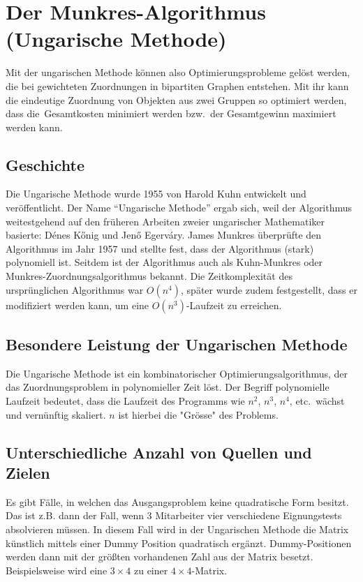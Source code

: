 %
%
%
\section{Der Munkres-Algorithmus (Ungarische Methode)
\label{munkres:section:teil3}}

Mit der ungarischen Methode können also Optimierungsprobleme gelöst
werden, die bei gewichteten Zuordnungen in bipartiten Graphen entstehen.
Mit ihr kann die eindeutige Zuordnung von Objekten aus zwei Gruppen so
optimiert werden, dass die Gesamtkosten minimiert werden bzw.~der
Gesamtgewinn maximiert werden kann. 

\subsection{Geschichte
\label{munkres:subsection:malorum}}
Die Ungarische Methode wurde 1955 von Harold Kuhn entwickelt und veröffentlicht.
Der Name ``Ungarische Methode'' ergab sich, weil der Algorithmus
weitestgehend auf den früheren Arbeiten zweier ungarischer Mathematiker
basierte: Dénes Kőnig und Jenő Egerváry.
James Munkres überprüfte den Algorithmus im Jahr 1957 und stellte fest,
dass der Algorithmus (stark) polynomiell ist.
Seitdem ist der Algorithmus auch als Kuhn-Munkres oder
Munkres-Zuordnungsalgorithmus bekannt.
Die Zeitkomplexität des ursprünglichen Algorithmus war $O(n^4)$,
später wurde zudem festgestellt, dass er modifiziert werden kann,
um eine  $O(n^3)$-Laufzeit zu erreichen.

\subsection{Besondere Leistung der Ungarischen Methode
\label{munkres:subsection:malorum}}
Die Ungarische Methode ist ein kombinatorischer Optimierungsalgorithmus, der das Zuordnungsproblem
in polynomieller Zeit löst.
Der Begriff polynomielle Laufzeit bedeutet, dass die Laufzeit des Programms
wie $n^2$, $n^3$, $n^4$, etc.~wächst und vernünftig skaliert. $n$ ist hierbei die "Grösse" des Problems.

\subsection{Unterschiedliche Anzahl von Quellen und Zielen
\label{munkres:subsection:malorum}}
Es gibt Fälle, in welchen das Ausgangsproblem keine quadratische Form besitzt. Das ist z.B. dann der Fall, wenn 3 Mitarbeiter vier verschiedene Eignungstests absolvieren müssen. In diesem Fall wird in der Ungarischen Methode die Matrix künstlich mittels einer Dummy Position quadratisch ergänzt. Dummy-Positionen werden dann mit der größten vorhandenen Zahl aus der Matrix besetzt. Beispielsweise wird eine $3\times 4$ zu einer $4\times 4$-Matrix.

